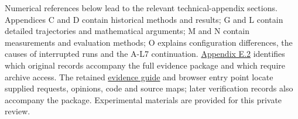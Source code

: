 Numerical references below lead to the relevant technical-appendix sections. Appendices C and D contain historical methods and results; G and L contain detailed trajectories and mathematical arguments; M and N contain measurements and evaluation methods; O explains configuration differences, the causes of interrupted runs and the A-L7 continuation. \href{en-appendix.pdf\#e2}{Appendix E.2} identifies which original records accompany the full evidence package and which require archive access. The retained \href{EVIDENCE_GUIDE.pdf}{evidence guide} and browser entry point locate supplied requests, opinions, code and source maps; later verification records also accompany the package. Experimental materials are provided for this private review.

\begingroup\small\setlength{\tabcolsep}{3pt}\renewcommand{\arraystretch}{1.14}
